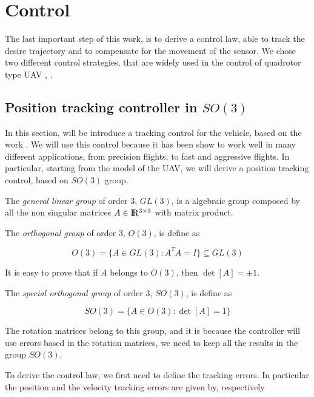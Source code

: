 \chapter{Control}
\label{control}

The last important step of this work, is to derive a control law, able to track the desire trajectory and to compensate for the movement of the sensor. We chose two different control strategies, that are widely used in the control of quadrotor type UAV \cite{LeeController}, \cite{MPCGeorge}.

\section{Position tracking controller in \texorpdfstring{$SO(3)$}{TEXT}}

In this section, will be introduce a tracking control for the vehicle, based on the work \cite{LeeController}. We will use this control because it has been show to work well in many different applications, from precision flights, to fast and aggressive flights. In particular, starting from the model of the UAV, we will derive a position tracking control, based on $SO(3)$ group.

\noindent The \textit{general linear group} of order $3$, $GL(3)$, is a algebraic group composed by all the non singular matrices $A \in \rm I\!R^{3\times 3}$ with matrix product.

\noindent The \textit{orthogonal group} of order $3$, $O(3)$, is define as

\begin{equation*}
	O(3) = \{A \in GL(3) : A^TA=I \} \subseteq GL(3)
\end{equation*}

\noindent It is easy to prove that if $A$ belongs to $O(3)$, then $\det[A]=\pm 1$.

\noindent The \textit{special orthogonal group} of order $3$, $SO(3)$, is define as

\begin{equation*}
	SO(3) = \{A \in O(3) : \det[A] = 1\} 
\end{equation*}

\noindent The rotation matrices belong to this group, and it is because the controller will use errors based in the rotation matrices, we need to keep all the results in the group $SO(3)$.

\noindent To derive the control law, we first need to define the tracking errors. In particular the position and the velocity tracking errors are given by, respectively


